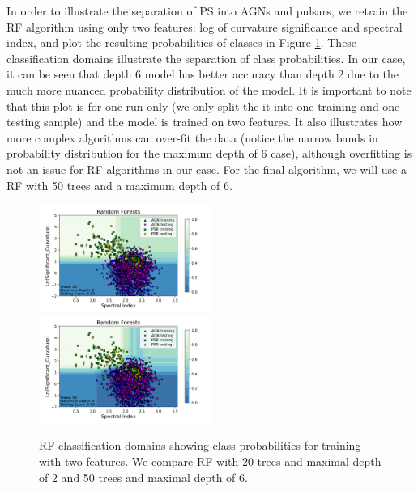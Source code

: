 In order to illustrate the separation of PS into AGNs and pulsars, we retrain the RF algorithm using only two features: log of curvature significance and spectral index, and plot the resulting probabilities of classes in Figure \ref{fig:RF_domains}. 
These classification domains illustrate the separation of class probabilities.
In our case, it can be seen that depth 6 model has better accuracy than 
depth 2 due to the much more nuanced probability distribution of the model. 
It is important to note that this plot is for one run only (we only split the it into one training and one testing sample) and the model is trained on two features.
It also illustrates how more complex algorithms can over-fit the data 
(notice the narrow bands in probability distribution for the maximum depth of 6 case), 
although overfitting is not an issue for RF algorithms in our case.
For the final algorithm, we will use a RF with 50 trees and a maximum depth of 6.

\begin{figure}[h]
\includegraphics[width=0.5\textwidth]{plots/classification_domains/rf_20_2_final.pdf}
\includegraphics[width=0.5\textwidth]{plots/classification_domains/rf_50_6_final.pdf}
\caption{RF classification domains showing class probabilities for training with two features. 
We compare RF with 20 trees and maximal depth of 2 and 50 trees and maximal depth of 6.
}  
\label{fig:RF_domains}
\end{figure}



